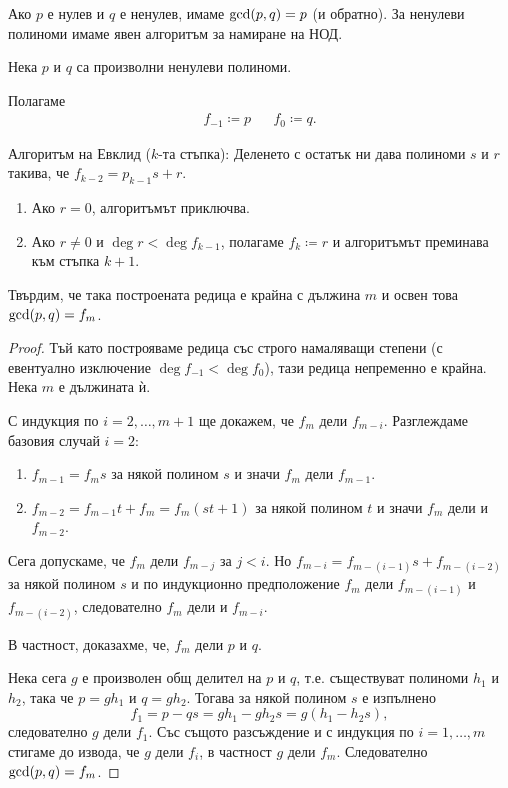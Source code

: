 \documentclass[numbers=endperiod, DIV=15]{scrartcl}
\begin{document}
Ако $p$ е нулев и $q$ е ненулев, имаме $\operatorname{gcd}(p, q) = p$ (и обратно). За ненулеви полиноми имаме явен алгоритъм за намиране на НОД.
\begin{theorem}
  Нека $p$ и $q$ са произволни ненулеви полиноми.

  Полагаме
  \begin{align*}
     f_{-1} \coloneqq p &&
     f_0 \coloneqq q.
  \end{align*}

  Алгоритъм на Евклид ($k$-та стъпка): Деленето с остатък ни дава полиноми $s$ и $r$ такива, че $f_{k-2} = p_{k-1} s + r$.
    \begin{enumerate}
      \item Ако $r = 0$, алгоритъмът приключва.
      \item Ако $r \neq 0$ и $\deg r < \deg f_{k-1}$, полагаме $f_k \coloneqq r$ и алгоритъмът преминава към стъпка $k + 1$.
    \end{enumerate}

  Твърдим, че така построената редица е крайна с дължина $m$ и освен това $\operatorname{gcd}(p, q) = f_m$.
\end{theorem}
\begin{proof}
  Тъй като построяваме редица със строго намаляващи степени (с евентуално изключение $\deg f_{-1} < \deg f_0$), тази редица непременно е крайна. Нека $m$ е дължината ѝ.

  С индукция по $i = 2, \ldots, m + 1$ ще докажем, че $f_m$ дели $f_{m-i}$. Разглеждаме базовия случай $i = 2$:
  \begin{enumerate}
    \item $f_{m-1} = f_m s$ за някой полином $s$ и значи $f_m$ дели $f_{m-1}$.
    \item $f_{m-2} = f_{m-1} t + f_m = f_m (s t + 1)$ за някой полином $t$ и значи $f_m$ дели и $f_{m-2}$.
  \end{enumerate}

  Сега допускаме, че $f_m$ дели $f_{m-j}$ за $j < i$. Но $f_{m-i} = f_{m-(i-1)} s + f_{m-(i-2)}$ за някой полином $s$ и по индукционно предположение $f_m$ дели $f_{m-(i-1)}$ и $f_{m-(i-2)}$, следователно $f_m$ дели и $f_{m-i}$.

  В частност, доказахме, че, $f_m$ дели $p$ и $q$.

  Нека сега $g$ е произволен общ делител на $p$ и $q$, т.е. съществуват полиноми $h_1$ и $h_2$, така че $p = g h_1$ и $q = g h_2$. Тогава за някой полином $s$ е изпълнено
  \begin{displaymath}
    f_1 = p - qs = g h_1 - g h_2 s = g (h_1 - h_2 s),
  \end{displaymath}
  следователно $g$ дели $f_1$. Със същото разсъждение и с индукция по $i = 1, \ldots, m$ стигаме до извода, че $g$ дели $f_i$, в частност $g$ дели $f_m$. Следователно $\operatorname{gcd}(p, q) = f_m$.
\end{proof}
\end{document}
